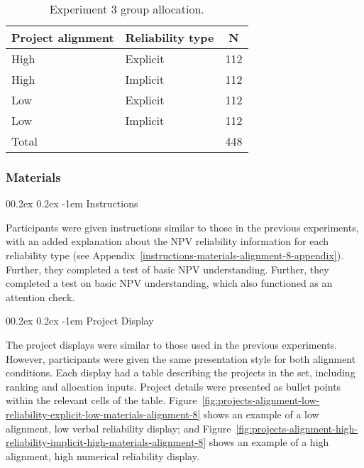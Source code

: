\documentclass[
  english,
  man, donotrepeattitle,floatsintext]{apa7}
\makeatletter
\let\oldparagraph\paragraph
\renewcommand{\paragraph}[1]{\oldparagraph{#1}\mbox{}}
\renewcommand{\paragraph}{\@startsection{paragraph}{4}{\parindent}%
  {0\baselineskip \@plus 0.2ex \@minus 0.2ex}%
  {-1em}%
  {\normalfont\normalsize\bfseries\itshape\typesectitle}}
\theoremstyle{definition}
\theoremstyle{definition}
\theoremstyle{definition}
\theoremstyle{definition}
\theoremstyle{remark}
\makeatother
\begin{document}
\begin{table}[tbp]

\begin{center}
\begin{threeparttable}

\caption{\label{tab:condition-allocation-alignment-8}Experiment 3 group allocation.}

\begin{tabular}{lll}
\toprule
Project alignment & \multicolumn{1}{c}{Reliability type} & \multicolumn{1}{c}{N}\\
\midrule
High & Explicit & 112\\
High & Implicit & 112\\
Low & Explicit & 112\\
Low & Implicit & 112\\
Total &  & 448\\
\bottomrule
\end{tabular}

\end{threeparttable}
\end{center}

\end{table}

\hypertarget{materials-1}{%
\subsubsection{Materials}\label{materials-1}}

\hypertarget{instructions-1}{%
\paragraph{Instructions}\label{instructions-1}}

Participants were given instructions similar to those in the previous
experiments, with an added explanation about the NPV reliability information for
each reliability type (see
Appendix~\ref{instructions-materials-alignment-8-appendix}). Further, they
completed a test of basic NPV understanding. Further, they completed a test on
basic NPV understanding, which also functioned as an attention check.

\hypertarget{project-display-1}{%
\paragraph{Project Display}\label{project-display-1}}

The project displays were similar to those used in the previous experiments.
However, participants were given the same presentation style for both alignment
conditions. Each display had a table describing the projects in the set,
including ranking and allocation inputs. Project details were presented as
bullet points within the relevant cells of the table.
Figure~\ref{fig:projects-alignment-low-reliability-explicit-low-materials-alignment-8}
shows an example of a low alignment, low verbal reliability display; and
Figure~\ref{fig:projects-alignment-high-reliability-implicit-high-materials-alignment-8}
shows an example of a high alignment, high numerical reliability display.
\end{document}
